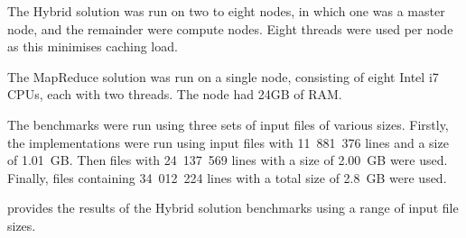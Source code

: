 \documentclass[12pt,twocolumn]{witseiepaper}
\begin{document}
The Hybrid solution was run on two to eight nodes, in which one was a master node, and the remainder were compute nodes. Eight threads were used per node as this minimises caching load.

The MapReduce solution was run on a single node, consisting of eight Intel i7 CPUs, each with two threads. The node had 24GB of RAM.

The benchmarks were run using three sets of input files of various sizes. Firstly, the implementations were run using input files with 11~881~376 lines and a size of 1.01~GB. Then files with 24~137~569 lines with a size of 2.00~GB were used. Finally, files containing 34~012~224 lines with a total size of 2.8~GB were used. 

 provides the results of the Hybrid solution benchmarks using a range of input file sizes.

\begin{table}[!htbp]
	\caption{Comparison of time taken (in seconds) to compute the equi-join using Hybrid solution with various input files over scaled numbers of nodes}
	\centering
	\label{tab:results1}
\end{table}

\begin{table}[!htbp]
	\centering
	\caption{Comparison of time taken (in seconds) to compute the equi-join using MapReduce with different input files sizes over various numbers of threads}
	\label{tab:mapreduceresults}
\end{table}
\end{document}
